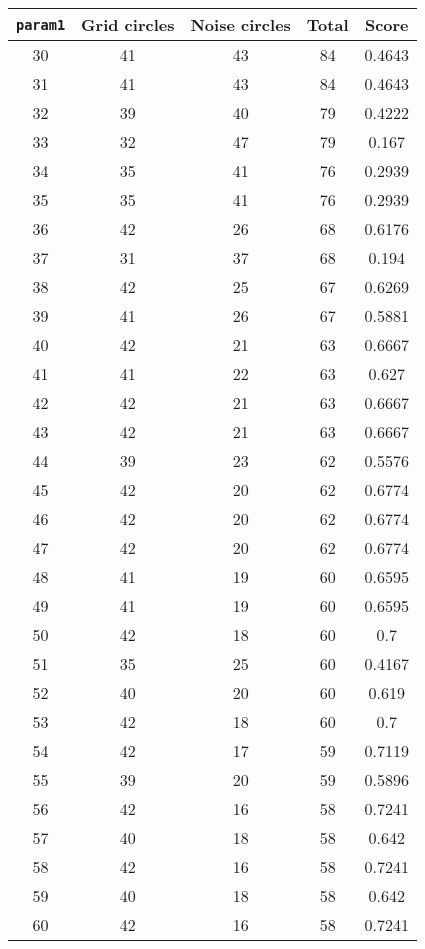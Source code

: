 \documentclass[letterpaper, 12pt]{article}
\begin{document}
\begin{longtable}{|c|c|c|c|c|}
\hline
\textbf{\texttt{param1}} & \textbf{Grid circles} & \textbf{Noise circles} & \textbf{Total} & \textbf{Score} \\
\hline
30 & 41 & 43 & 84 & 0.4643 \\
\hline
31 & 41 & 43 & 84 & 0.4643 \\
\hline
32 & 39 & 40 & 79 & 0.4222 \\
\hline
33 & 32 & 47 & 79 & 0.167 \\
\hline
34 & 35 & 41 & 76 & 0.2939 \\
\hline
35 & 35 & 41 & 76 & 0.2939 \\
\hline
36 & 42 & 26 & 68 & 0.6176 \\
\hline
37 & 31 & 37 & 68 & 0.194 \\
\hline
38 & 42 & 25 & 67 & 0.6269 \\
\hline
39 & 41 & 26 & 67 & 0.5881 \\
\hline
40 & 42 & 21 & 63 & 0.6667 \\
\hline
41 & 41 & 22 & 63 & 0.627 \\
\hline
42 & 42 & 21 & 63 & 0.6667 \\
\hline
43 & 42 & 21 & 63 & 0.6667 \\
\hline
44 & 39 & 23 & 62 & 0.5576 \\
\hline
45 & 42 & 20 & 62 & 0.6774 \\
\hline
46 & 42 & 20 & 62 & 0.6774 \\
\hline
47 & 42 & 20 & 62 & 0.6774 \\
\hline
48 & 41 & 19 & 60 & 0.6595 \\
\hline
49 & 41 & 19 & 60 & 0.6595 \\
\hline
50 & 42 & 18 & 60 & 0.7 \\
\hline
51 & 35 & 25 & 60 & 0.4167 \\
\hline
52 & 40 & 20 & 60 & 0.619 \\
\hline
53 & 42 & 18 & 60 & 0.7 \\
\hline
54 & 42 & 17 & 59 & 0.7119 \\
\hline
55 & 39 & 20 & 59 & 0.5896 \\
\hline
56 & 42 & 16 & 58 & 0.7241 \\
\hline
57 & 40 & 18 & 58 & 0.642 \\
\hline
58 & 42 & 16 & 58 & 0.7241 \\
\hline
59 & 40 & 18 & 58 & 0.642 \\
\hline
60 & 42 & 16 & 58 & 0.7241 \\

\end{longtable}
\end{document}
